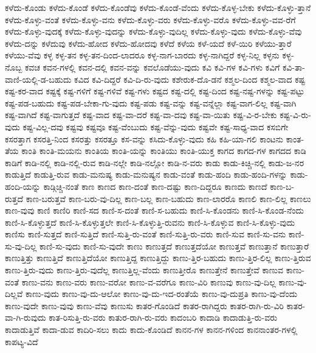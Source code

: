 {ಕಳೆದು-ಕೊಂಡು
ಕಳೆದು-ಕೊಂಡೆ
ಕಳೆದು-ಕೊಂಡೆವು
ಕಳೆದು-ಕೊಂಡೆ-ವೆಂದು
ಕಳೆದು-ಕೊಳ್ಳ-ಬೇಕು
ಕಳೆದು-ಕೊಳ್ಳು-ತ್ತಾನೆ
ಕಳೆದು-ಕೊಳ್ಳು-ವಂತೆ
ಕಳೆದು-ಕೊಳ್ಳು-ವನು
ಕಳೆದು-ಕೊಳ್ಳು-ವರು
ಕಳೆದು-ಕೊಳ್ಳು-ವರೊ
ಕಳೆದು-ಕೊಳ್ಳು-ವವ-ರೆಗೆ
ಕಳೆದು-ಕೊಳ್ಳು-ವುದಕ್ಕೆ
ಕಳೆದು-ಕೊಳ್ಳು-ವುದನ್ನು
ಕಳೆದು-ಕೊಳ್ಳು-ವುದಿಲ್ಲ
ಕಳೆದು-ಕೊಳ್ಳು-ವುದು
ಕಳೆದು-ಕೊಳ್ಳು-ವೆವು
ಕಳೆದು-ದನ್ನು
ಕಳೆದುವು
ಕಳೆದು-ಹೋದ
ಕಳೆದು-ಹೋದವು
ಕಳೆದೆ
ಕಳೆಯ
ಕಳೆ-ಯದೆ
ಕಳೆ-ಯಿರಿ
ಕಳೆಯು-ತ್ತಾರೆ
ಕಳೆಯು-ವೆವು
ಕಳ್ಳ
ಕಳ್ಳ-ತನ
ಕಳ್ಳ-ತನ-ದಿಂದ-ಲಾದರೂ
ಕಳ್ಳ-ನಾಗ-ಬಾರದು
ಕಳ್ಳ-ನಾಗಿದ್ದರೆ
ಕಳ್ಳ-ನಿಲ್ಲ
ಕಳ್ಳನು
ಕಳ್ಳ-ನೊಬ್ಬ
ಕವಚ
ಕವನ-ಗಳಲ್ಲಿ
ಕವನ-ದಲ್ಲಿ
ಕವನ-ವನ್ನು
ಕವಲೊಡೆಯು-ವುದು
ಕವಿ
ಕವಿ-ಗಳ
ಕವಿ-ಗಳು
ಕವಿಗೆ
ಕವಿ-ತಾ-ವಾಣಿ-ಯಲ್ಲಿ-ಡ-ಬಹುದು
ಕವಿದ
ಕವಿ-ದಿದ್ದರೆ
ಕವಿ-ದಿ-ರು-ವುದು
ಕಶೇರುಕ-ದೊ-ಡನೆ
ಕಶ್ಮಲ-ದಿಂದ
ಕಶ್ಮಲ-ವಾದ
ಕಷ್ಟ
ಕಷ್ಟ-ಕರ-ವಾದ
ಕಷ್ಟಕ್ಕೆ
ಕಷ್ಟ-ಗಳಿಗೆ
ಕಷ್ಟ-ಗಳಿವೆ
ಕಷ್ಟ-ಗಳು
ಕಷ್ಟದ
ಕಷ್ಟ-ದಲ್ಲಿ
ಕಷ್ಟ-ದಿಂದ
ಕಷ್ಟ-ನಷ್ಟ-ಗಳನ್ನು
ಕಷ್ಟ-ಪಟ್ಟು
ಕಷ್ಟ-ಪಡ-ಬಹುದು
ಕಷ್ಟ-ಪಡ-ಬೇಕಾ-ಗು-ವುದು
ಕಷ್ಟ-ಪಡು
ಕಷ್ಟ-ವನ್ನು
ಕಷ್ಟ-ವನ್ನೆಲ್ಲಾ
ಕಷ್ಟ-ವಾಗ-ಲಿಲ್ಲ
ಕಷ್ಟ-ವಾಗಿ
ಕಷ್ಟ-ವಾಗಿದೆ
ಕಷ್ಟ-ವಾಗುತ್ತದೆ
ಕಷ್ಟ-ವಾದ
ಕಷ್ಟ-ವಾ-ದರೆ
ಕಷ್ಟ-ವಾ-ದವು
ಕಷ್ಟ-ವಾ-ಯಿತು
ಕಷ್ಟ-ವಿ-ರ-ಬೇಕು
ಕಷ್ಟ-ವಿ-ರು-ವುದು
ಕಷ್ಟ-ವಿಲ್ಲ-ದವು
ಕಷ್ಟವು
ಕಷ್ಟವೂ
ಕಷ್ಟ-ವೆಂಬುದು
ಕಷ್ಟ-ವೆನ್ನು-ವುದು
ಕಷ್ಟವೇ
ಕಷ್ಟ-ಸಾಧ್ಯ-ವಾದ
ಕಸಬಿಗೇ
ಕಸರತ್ತಾಗ
ಕಸರತ್ತಿ-ನಿಂದ
ಕಸರತ್ತು
ಕಸರತ್ತೂ
ಕಸ-ವನ್ನು
ಕಸಿದು-ಕೊಳ್ಳು-ವುದು
ಕಹಿ
ಕಹಿ-ಯಾ-ಗಲಿ
ಕಾಂಟನು
ಕಾಂತ-ತೆಯ
ಕಾಂತಿ
ಕಾಂತಿ-ಮಯನು
ಕಾಂತಿಯ
ಕಾಂತಿ-ಯನ್ನು
ಕಾಂತಿಯು
ಕಾಂತಿ-ಯುಕ್ತ
ಕಾಗದ
ಕಾಗದ-ಗಳ
ಕಾಗದದ
ಕಾಡಿ
ಕಾಡಿಗೆ
ಕಾಡಿ-ನಲ್ಲಿ
ಕಾಡಿ-ನಲ್ಲಿ-ರುವ
ಕಾಡಿ-ನಲ್ಲೇ
ಕಾಡಿ-ನಲ್ಲೋ
ಕಾಡಿ-ನ-ವರು
ಕಾಡು
ಕಾಡು-ಕಿಚ್ಚಿ-ನಲ್ಲಿ
ಕಾಡು-ಜ-ನರ
ಕಾಡುತ್ತಿದೆ
ಕಾಡುತ್ತಿ-ರುವ
ಕಾಡು-ಮನುಷ್ಯ
ಕಾಡು-ಮನುಷ್ಯನ
ಕಾಡು-ವಂತೆ
ಕಾಡು-ಹಂದಿ
ಕಾಡು-ಹಂದಿ-ಗಳನ್ನು
ಕಾಡು-ಹಂದಿ-ಯನ್ನು
ಕಾಡ್ಗಿಚ್ಚಿ-ನಂತೆ
ಕಾಣ
ಕಾಣದ
ಕಾಣ-ದಂತೆ
ಕಾಣ-ದಷ್ಟು
ಕಾಣ-ದಿದ್ದರೂ
ಕಾಣದು
ಕಾಣದೆ
ಕಾಣ-ಬ-ರುತ್ತದೆ
ಕಾಣ-ಬರುತ್ತವೆ
ಕಾಣ-ಬರು-ವು-ದಿಲ್ಲ
ಕಾಣ-ಬಲ್ಲ
ಕಾಣ-ಬಹುದು
ಕಾಣ-ಲಾರರೊ
ಕಾಣಲಿ
ಕಾಣ-ಲಿಲ್ಲ
ಕಾಣಲು
ಕಾಣ-ವುವು
ಕಾಣಿ
ಕಾಣಿರಿ
ಕಾಣಿ-ಸದ
ಕಾಣಿ-ಸ-ದಂತೆ
ಕಾಣಿ-ಸ-ಬಹುದು
ಕಾಣಿ-ಸಿ-ಕೊಂಡನು
ಕಾಣಿ-ಸಿ-ಕೊಂಡ-ನೆಂದು
ಕಾಣಿ-ಸಿ-ಕೊಳ್ಳುತ್ತದೆ
ಕಾಣಿ-ಸಿ-ಕೊಳ್ಳುತ್ತಲೇ
ಕಾಣಿ-ಸಿ-ಕೊಳ್ಳುತ್ತಿ-ರುವನು
ಕಾಣಿ-ಸಿ-ಕೊಳ್ಳುವ
ಕಾಣಿ-ಸಿ-ಕೊಳ್ಳು-ವುದು
ಕಾಣಿಸು
ಕಾಣಿ-ಸುತ್ತದೆ
ಕಾಣಿ-ಸುತ್ತಿದೆ
ಕಾಣಿ-ಸುತ್ತಿ-ರು-ವಂತೆ
ಕಾಣಿ-ಸುತ್ತಿ-ರು-ವರು
ಕಾಣಿ-ಸುವ
ಕಾಣಿ-ಸು-ವನು
ಕಾಣಿ-ಸು-ವು-ದಿಲ್ಲ
ಕಾಣಿ-ಸು-ವುದು
ಕಾಣಿ-ಸು-ವುದೇ
ಕಾಣು
ಕಾಣುತ್ತದೆ
ಕಾಣುತ್ತದೆಯೋ
ಕಾಣುತ್ತವೆ
ಕಾಣುತ್ತಾನೆ
ಕಾಣುತ್ತಾರೆ
ಕಾಣುತ್ತಿತ್ತು
ಕಾಣುತ್ತಿದೆ
ಕಾಣುತ್ತಿದೆಯೋ
ಕಾಣುತ್ತಿದ್ದ
ಕಾಣುತ್ತಿದ್ದು
ಕಾಣು-ತ್ತಿರ-ಬಹುದು
ಕಾಣು-ತ್ತಿರ-ಲಿಲ್ಲ
ಕಾಣು-ತ್ತಿರುವ
ಕಾಣು-ತ್ತಿರು-ವುದು
ಕಾಣು-ತ್ತಿರು-ವುದೆಲ್ಲ
ಕಾಣುತ್ತಿಲ್ಲ-ವೆಂದು
ಕಾಣುತ್ತೀರೊ
ಕಾಣುತ್ತೇನೆ
ಕಾಣುತ್ತೇವೆ
ಕಾಣುವ
ಕಾಣು-ವಂತೆ
ಕಾಣು-ವನು
ಕಾಣು-ವರು
ಕಾಣು-ವರೋ
ಕಾಣು-ವ-ವರೆಗೂ
ಕಾಣು-ವಿರಿ
ಕಾಣುವು
ಕಾಣು-ವು-ದಿಲ್ಲ
ಕಾಣು-ವು-ದಿಲ್ಲವೆ
ಕಾಣು-ವುದು
ಕಾಣು-ವು-ದು-ಆಲೋ
ಕಾಣು-ವು-ದು-ಇದ-ರಂತೆಯೆ
ಕಾಣು-ವು-ದುಪ್ರತಿ
ಕಾಣು-ವು-ದೆಂದು
ಕಾಣು-ವುದೇ
ಕಾಣು-ವುವು
ಕಾಣು-ವೆವು
ಕಾಣುಸು
ಕಾತರ-ಗೊಂಡಿದೆ
ಕಾತರ-ರಾಗಿದ್ದರು
ಕಾತರ-ರಾಗಿ-ರು-ವಿರಿ
ಕಾತರ-ವಾ-ಗಿ-ರುವುದು
ಕಾತ-ರಿಸುತ್ತಿ-ರು-ವರು
ಕಾತುರ-ರಾಗಿ-ರು-ವರು
ಕಾದಂಬರಿ
ಕಾದಾಡಿ
ಕಾದಾಡುತ್ತಿ-ರು-ವರು
ಕಾದಾಡುತ್ತಿವೆ
ಕಾದಾ-ಡುವ
ಕಾದಿರಿ-ಸಲು
ಕಾದು
ಕಾದು-ಕೊಂಡಿದೆ
ಕಾನನ-ಗಳ
ಕಾನನ-ಗಳಿಂದ
ಕಾನನಾಂತರ-ಗಳಲ್ಲಿ
ಕಾಪಟ್ಯ-ವಿದೆ
}
